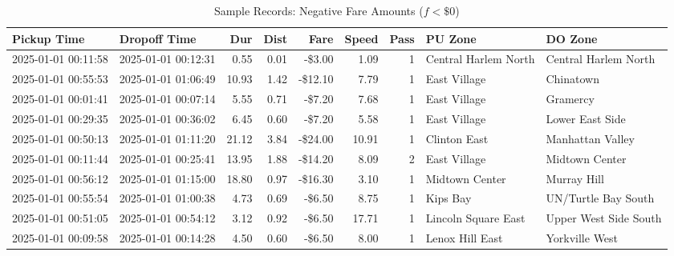 \documentclass[11pt,a4paper]{article}
\begin{document}
\begin{table}[htbp]
\centering
\caption{Sample Records: Negative Fare Amounts ($f < \$0$)}
\label{tab:sample_negfare}
\tiny
\begin{tabularx}{\textwidth}{l l r r r r r X X}
\toprule
\textbf{Pickup Time} & \textbf{Dropoff Time} & \textbf{Dur} & \textbf{Dist} & \textbf{Fare} & \textbf{Speed} & \textbf{Pass} & \textbf{PU Zone} & \textbf{DO Zone} \\
\midrule
2025-01-01 00:11:58 & 2025-01-01 00:12:31 & 0.55 & 0.01 & -\$3.00 & 1.09 & 1 & Central Harlem North & Central Harlem North \\
2025-01-01 00:55:53 & 2025-01-01 01:06:49 & 10.93 & 1.42 & -\$12.10 & 7.79 & 1 & East Village & Chinatown \\
2025-01-01 00:01:41 & 2025-01-01 00:07:14 & 5.55 & 0.71 & -\$7.20 & 7.68 & 1 & East Village & Gramercy \\
2025-01-01 00:29:35 & 2025-01-01 00:36:02 & 6.45 & 0.60 & -\$7.20 & 5.58 & 1 & East Village & Lower East Side \\
2025-01-01 00:50:13 & 2025-01-01 01:11:20 & 21.12 & 3.84 & -\$24.00 & 10.91 & 1 & Clinton East & Manhattan Valley \\
2025-01-01 00:11:44 & 2025-01-01 00:25:41 & 13.95 & 1.88 & -\$14.20 & 8.09 & 2 & East Village & Midtown Center \\
2025-01-01 00:56:12 & 2025-01-01 01:15:00 & 18.80 & 0.97 & -\$16.30 & 3.10 & 1 & Midtown Center & Murray Hill \\
2025-01-01 00:55:54 & 2025-01-01 01:00:38 & 4.73 & 0.69 & -\$6.50 & 8.75 & 1 & Kips Bay & UN/Turtle Bay South \\
2025-01-01 00:51:05 & 2025-01-01 00:54:12 & 3.12 & 0.92 & -\$6.50 & 17.71 & 1 & Lincoln Square East & Upper West Side South \\
2025-01-01 00:09:58 & 2025-01-01 00:14:28 & 4.50 & 0.60 & -\$6.50 & 8.00 & 1 & Lenox Hill East & Yorkville West \\
\bottomrule
\end{tabularx}
\end{table}
\end{document}
